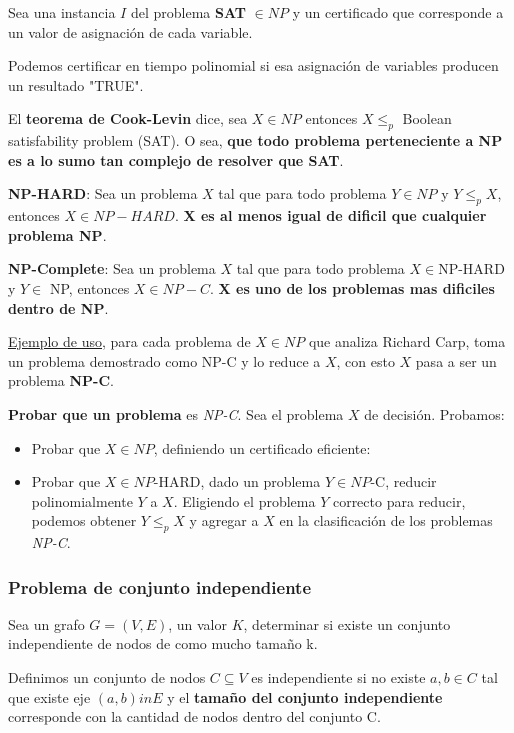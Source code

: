 \documentclass{article}
\begin{document}
Sea una instancia \(I\) del problema \textbf{SAT} \(\in NP\) y un certificado que corresponde a un valor
de asignación de cada variable.

Podemos certificar en tiempo polinomial si esa asignación de variables producen un resultado "TRUE".

El \textbf{teorema de Cook-Levin} dice, sea \(X \in NP\) entonces \(X \leq_p\) Boolean satisfability problem (SAT). 
O sea, \textbf{que todo problema perteneciente a NP es a lo sumo tan complejo de resolver que SAT}.
 
\textbf{NP-HARD}: Sea un problema \(X\) tal que para todo problema \(Y \in NP\) y \(Y \leq_p X\), entonces \(X \in NP-HARD\).
\textbf{X es al menos igual de dificil que cualquier problema NP}.

\textbf{NP-Complete}: Sea un problema \(X\) tal que para todo problema \(X \in\)NP-HARD y \(Y \in \) NP, entonces \(X \in NP-C\).
\textbf{X es uno de los problemas mas dificiles dentro de NP}.

\underline{Ejemplo de uso}, para cada problema de \(X \in NP\) que analiza Richard Carp, toma un problema 
demostrado como NP-C y lo reduce a \(X\), con esto \(X\) pasa a ser un problema \textbf{NP-C}.

\textbf{Probar que un problema} es \textit{NP-C}. Sea el problema \(X\) de decisión. Probamos:

\begin{itemize}
    \item Probar que \(X \in NP\), definiendo un certificado eficiente:
    \item Probar que \(X \in NP\)-HARD, dado un problema \(Y \in NP\)-C, 
    reducir polinomialmente \(Y\) a \(X\). Eligiendo el problema \(Y\) correcto para reducir, 
    podemos obtener \(Y \leq_p X\) y agregar a \(X\) en la clasificación de los problemas \textit{NP-C}.
\end{itemize}

\subsubsection{Problema de conjunto independiente}

Sea un grafo \(G=(V,E)\), un valor \(K\), determinar si existe un conjunto independiente de nodos 
de como mucho tamaño k.

Definimos un conjunto de nodos \(C \subseteq V\) es independiente si no existe \(a,b \in C\) tal que existe eje \((a,b) in E\) 
y el \textbf{tamaño del conjunto independiente} corresponde con la cantidad de nodos dentro del conjunto C.
\end{document}
